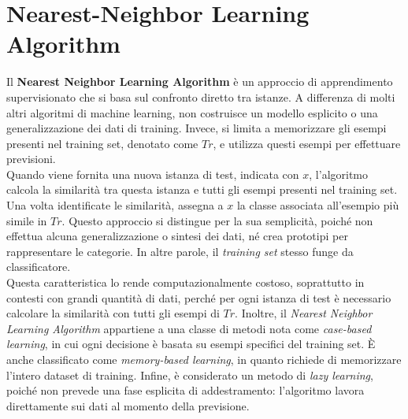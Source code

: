 \documentclass{report}
\begin{document}
	\section{Nearest-Neighbor Learning Algorithm}
	Il \textbf{Nearest Neighbor Learning Algorithm} è un approccio di apprendimento supervisionato che si basa sul confronto diretto tra istanze. A differenza di molti altri algoritmi di machine learning, non costruisce un modello esplicito o una generalizzazione dei dati di training. Invece, si limita a memorizzare gli esempi presenti nel training set, denotato come \(Tr\), e utilizza questi esempi per effettuare previsioni.
	\vspace{\baselineskip}\\
	Quando viene fornita una nuova istanza di test, indicata con \(x\), l'algoritmo calcola la similarità tra questa istanza e tutti gli esempi presenti nel training set. Una volta identificate le similarità, assegna a \(x\) la classe associata all'esempio più simile in \(Tr\). Questo approccio si distingue per la sua semplicità, poiché non effettua alcuna generalizzazione o sintesi dei dati, né crea prototipi per rappresentare le categorie. In altre parole, il \textit{training set} stesso funge da classificatore.
	\vspace{\baselineskip}\\
	Questa caratteristica lo rende computazionalmente costoso, soprattutto in contesti con grandi quantità di dati, perché per ogni istanza di test è necessario calcolare la similarità con tutti gli esempi di \(Tr\). Inoltre, il \textit{Nearest Neighbor Learning Algorithm} appartiene a una classe di metodi nota come \textit{case-based learning}, in cui ogni decisione è basata su esempi specifici del training set. È anche classificato come \textit{memory-based learning}, in quanto richiede di memorizzare l'intero dataset di training. Infine, è considerato un metodo di \textit{lazy learning}, poiché non prevede una fase esplicita di addestramento: l'algoritmo lavora direttamente sui dati al momento della previsione.
\end{document}
